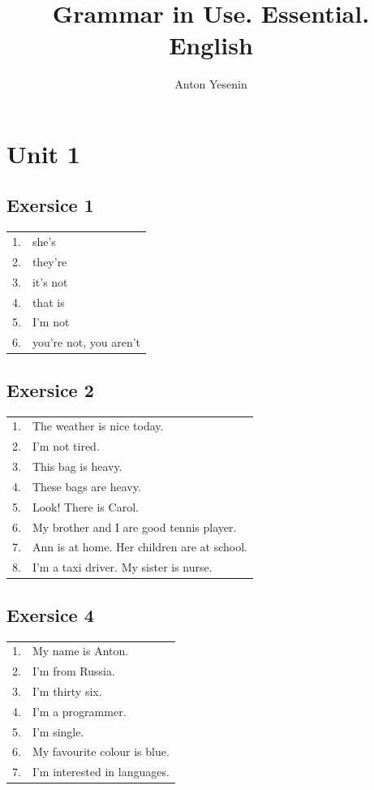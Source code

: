 \documentclass[9pt, oneside]{article}
\title{Grammar in Use. Essential. English}
\author{Anton Yesenin}
\date{}
\begin{document}
\maketitle
\pagebreak
\section{Unit 1}
\subsection{Exersice 1}
\begin{tabular}{l l}
1. & she's\\
2. & they're\\
3. & it's not\\
4. & that is\\
5. & I'm not\\
6. & you're not, you aren't\\
\end{tabular}

\subsection{Exersice 2}
\begin{tabular}{l l}
1. & The weather is nice today.\\
2. & I'm not tired.\\
3. & This bag is heavy.\\
4. & These bags are heavy.\\
5. & Look! There is Carol.\\
6. & My brother and I are good tennis player.\\
7. & Ann is at home. Her children are at school.\\
8. & I'm a taxi driver. My sister is nurse.\\
\end{tabular}

\subsection{Exersice 4}
\begin{tabular}{l l}
1. & My name is Anton.\\
2. & I'm from Russia.\\
3. & I'm thirty six.\\
4. & I'm a programmer.\\
5. & I'm single.\\
6. & My favourite colour is blue.\\
7. & I'm interested in languages.\\
\end{tabular}
\end{document}
